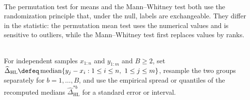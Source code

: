 \begin{remark} \label{rem:permutation-versus-rank-tests} \\
The permutation test for means and the Mann--Whitney test both use the randomization principle that, under the null, labels are exchangeable.  They differ in the statistic: the permutation mean test uses the numerical values and is sensitive to outliers, while the Mann--Whitney test first replaces values by ranks.
\end{remark}

\begin{method} \label{meth:bootstrap-hodges-lehmann-shift} \\
For independent samples $x_{1:n}$ and $y_{1:m}$ and $B\geq2$, set $\widehat{\Delta}_{\mathrm{HL}}\defeq\operatorname{median}\{y_j-x_i:1\leq i\leq n,\ 1\leq j\leq m\}$, resample the two groups separately for $b=1,\ldots,B$, and use the empirical spread or quantiles of the recomputed medians $\widehat{\Delta}_{\mathrm{HL}}^{\ast b}$ for a standard error or interval.
\end{method}
